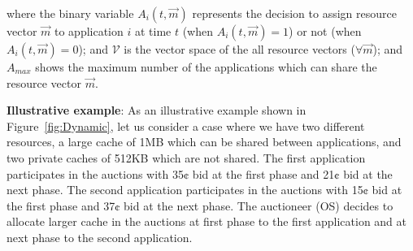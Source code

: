 where the binary variable $A_{i}(t, \vec{m})$ represents the decision to assign resource vector $\vec{m}$ to application $i$ at time $t$ (when $A_{i}(t, \vec{m}) =1$) or not (when $A_{i}(t, \vec{m})=0$); and $\mathcal{V}$ is the vector space of the all resource vectors ($\forall\vec{m}$); and $A_{max}$ shows the maximum number of the applications which can share the resource vector $\vec{m}$. 

\indent \textbf{Illustrative example}: As an illustrative example shown in Figure~\ref{fig:Dynamic}, let us consider a case where we have two different resources, a large cache of 1MB which can be shared between applications, and two private caches of 512KB which are not shared. 
The first application participates in the auctions with 35¢ bid at the first phase and 21¢ bid at the next phase. The second application participates in the auctions with 15¢ bid at the first phase and 37¢ bid at the next phase. The auctioneer (OS) decides to allocate larger cache in the auctions at first phase to the first application and at next phase to the second application. %
\vspace{-1\baselineskip}
